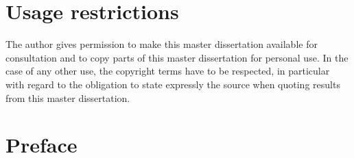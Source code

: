 \documentclass[11pt,british]{article}
\begin{document}
\renewcommand{\thepage}{\roman{page}}
\newpage
\thispagestyle{empty}
\mbox{}




\newpage{}\part*{Usage restrictions}

The author gives permission to make this master dissertation available for consultation 
and to copy parts of this master dissertation for personal use. 
 In the case of any other use, the copyright terms have to be respected, in particular with regard to 
the obligation to state expressly the source when quoting results from this master dissertation.

\pagebreak{}


\newpage{}\part*{Preface}

\pagebreak{}


\newpage{}
\begin{abstract}
\end{abstract}





\setcounter{tocdepth}{2}
\tableofcontents
\pagebreak


\listoffigures
\pagebreak


\listoftables
\pagebreak

\end{document}
